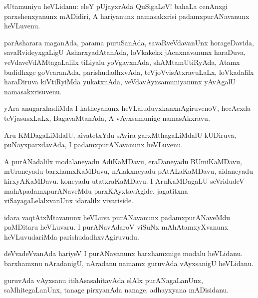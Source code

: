 \documentclass{article}
\begin{document}
\begin{mn}
sUtamuniyu heVLidanu: eleY pUjayxrAda 
QuSigaLeV! bahaLa cenAnxgi parxshenxyanunx mADidiri, A hariyanunx 
namasakxrisi padamxpurANavanunx heVLuvenu. 
\end{mn}

\begin{mn}
parAsharara maganAda, parama puruSanAda, savaRveVdavanUnx horageDavida, 
savaRvideyxgaLigU AsharxyadAtanAda, loVkakekx jAcnxnavanunx haraDuva, 
veVdaveVdAMtagaLalilx tiLiyalu yoVgayxnAda, shAMtamUtiRyAda,
Atamx budidhxge goVcaranAda, parishudadhxvAda,  teVjoVvisAtxravuLaLx, loVkadalilx 
haraDiruva kiVtiRyiMda yukatxnAda, veVdavAyxsamuniyanunx yAvAgalU namasakxrisuvenu.
\end{mn}

\begin{mn}
yAra anugarxhadiMda I katheyanunx heVLaluduyxkanxnAgiruvenoV, hecAcxda teVjasusxLaLx, 
BagavaMtanAda, A vAyxsamunige namasAkxravu.
\end{mn}

\begin{mn}
Aru KMDagaLiMdalU, aivatetxYdu  sAvira garxMthagaLiMdalU kUDiruva, puNayxparxdavAda,
I padamxpurANavanunx heVLuvenu.
\end{mn}

\begin{mn}
A purANadalilx modalaneyadu AdiKaMDavu, eraDaneyadu BUmiKaMDavu, 
mUraneyadu barxhamxKaMDavu, nAlakxneyadu pAtALaKaMDavu, aidaneyadu kirxyAKaMDavu. 
koneyadu utatxraKaMDavu. I AruKaMDagaLU seVridudeV mahApadamxpurANaveMdu
parxKAyxtavAgide. jagatitxna viSayagaLelalxvanUnx idaralilx vivariside.
\end{mn}

\begin{mn}
idara vaqtAtxMtavanunx heVLuva purANavanunx padamxpurANaveMdu paMDitaru heVLuvaru. 
I purANavAdaroV viSuNx mAhAtamxyXvanunx heVLuvudariMda parishudadhxvAgiruvudu.
\end{mn}

\begin{mn}
deVvadeVvanAda hariyeV I purANavanunx barxhamxnige modalu heVLidanu. 
barxhamxnu nAradanigU, nAradanu namamx guruvAda vAyxsanigU heVLidanu.
\end{mn}

\begin{mn}
guruvAda vAyxsanu itihAsasahitavAda elAlx purANagaLanUnx, saMhitegaLanUnx,
tanage pirxyanAda nanage, adhayxyana mADisidanu.
\end{mn}
\end{document}
